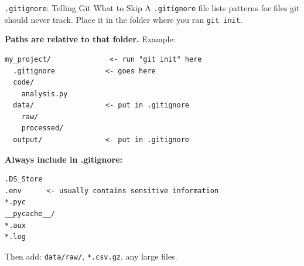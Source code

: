 \documentclass[aspectratio=169, 11pt]{beamer}
\begin{document}
\begin{frame}[fragile]{\texttt{.gitignore}: Telling Git What to Skip}
  A \texttt{.gitignore} file lists patterns for files git should never track. Place it in the folder where you ran \texttt{git init}.

  \vspace{0.08em}
  \textbf{Paths are relative to that folder.} Example:
  \begin{lstlisting}[basicstyle=\ttfamily\tiny]
my_project/              <- run "git init" here
  .gitignore            <- goes here
  code/
    analysis.py
  data/                 <- put in .gitignore
    raw/
    processed/
  output/               <- put in .gitignore
  \end{lstlisting}

  \vspace{0.08em}
  \textbf{Always include in .gitignore:}
  \begin{lstlisting}[basicstyle=\ttfamily\tiny]
.DS_Store
.env      <- usually contains sensitive information
*.pyc
__pycache__/
*.aux
*.log
  \end{lstlisting}

  \vspace{0.05em}
  Then add: \texttt{data/raw/}, \texttt{*.csv.gz}, any large files.
\end{frame}
\end{document}
